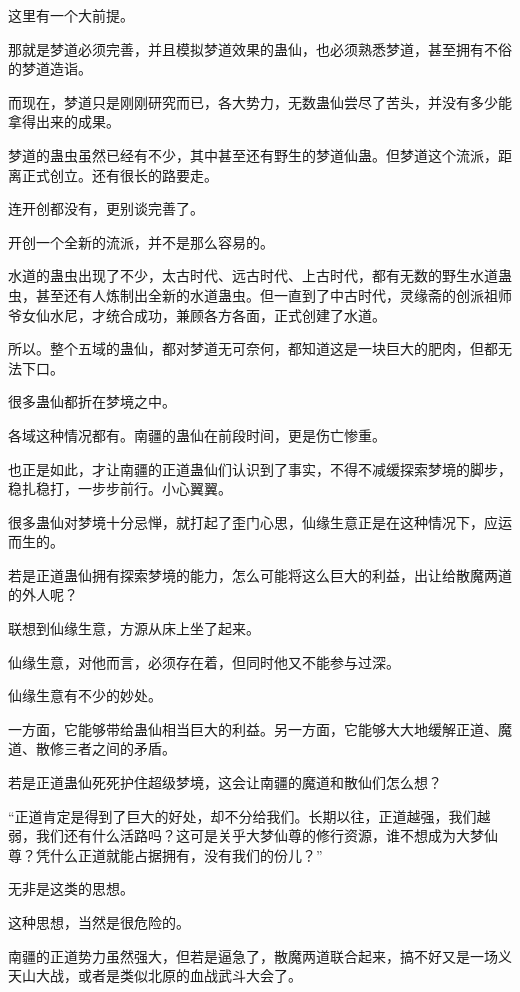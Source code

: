 \begin{this_body}
这里有一个大前提。

那就是梦道必须完善，并且模拟梦道效果的蛊仙，也必须熟悉梦道，甚至拥有不俗的梦道造诣。

而现在，梦道只是刚刚研究而已，各大势力，无数蛊仙尝尽了苦头，并没有多少能拿得出来的成果。

梦道的蛊虫虽然已经有不少，其中甚至还有野生的梦道仙蛊。但梦道这个流派，距离正式创立。还有很长的路要走。

连开创都没有，更别谈完善了。

开创一个全新的流派，并不是那么容易的。

水道的蛊虫出现了不少，太古时代、远古时代、上古时代，都有无数的野生水道蛊虫，甚至还有人炼制出全新的水道蛊虫。但一直到了中古时代，灵缘斋的创派祖师爷女仙水尼，才统合成功，兼顾各方各面，正式创建了水道。

所以。整个五域的蛊仙，都对梦道无可奈何，都知道这是一块巨大的肥肉，但都无法下口。

很多蛊仙都折在梦境之中。

各域这种情况都有。南疆的蛊仙在前段时间，更是伤亡惨重。

也正是如此，才让南疆的正道蛊仙们认识到了事实，不得不减缓探索梦境的脚步，稳扎稳打，一步步前行。小心翼翼。

很多蛊仙对梦境十分忌惮，就打起了歪门心思，仙缘生意正是在这种情况下，应运而生的。

若是正道蛊仙拥有探索梦境的能力，怎么可能将这么巨大的利益，出让给散魔两道的外人呢？

联想到仙缘生意，方源从床上坐了起来。

仙缘生意，对他而言，必须存在着，但同时他又不能参与过深。

仙缘生意有不少的妙处。

一方面，它能够带给蛊仙相当巨大的利益。另一方面，它能够大大地缓解正道、魔道、散修三者之间的矛盾。

若是正道蛊仙死死护住超级梦境，这会让南疆的魔道和散仙们怎么想？

“正道肯定是得到了巨大的好处，却不分给我们。长期以往，正道越强，我们越弱，我们还有什么活路吗？这可是关乎大梦仙尊的修行资源，谁不想成为大梦仙尊？凭什么正道就能占据拥有，没有我们的份儿？”

无非是这类的思想。

这种思想，当然是很危险的。

南疆的正道势力虽然强大，但若是逼急了，散魔两道联合起来，搞不好又是一场义天山大战，或者是类似北原的血战武斗大会了。


\end{this_body}
